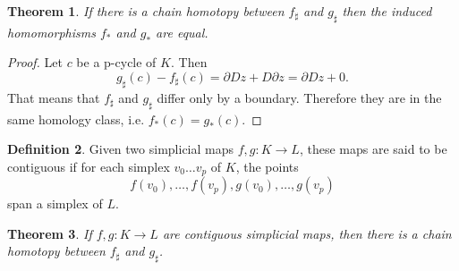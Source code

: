 \documentclass[toc=bib]{scrartcl}
\theoremstyle{plain}
\newtheorem{theorem}{Theorem}[section]
\theoremstyle{definition}
\newtheorem	{definition}[theorem]{Definition}
\theoremstyle{remark}
\begin{document}
\begin{theorem}\label{chain_hom->invariant}%
	If there is a chain homotopy between $f_\sharp$ and $g_\sharp$ then the induced homomorphisms $f_\ast$ and $g_\ast$ are equal.
\end{theorem}

\begin{proof}
	Let $c$ be a p-cycle of $K$. Then
	\[
	g_\sharp(c)-f_\sharp(c)=\partial Dz+D\partial z=\partial Dz+0.
	\]
	That means that $f_\sharp$ and $g_\sharp$ differ only by a boundary. Therefore they are in the same homology class, i.e. $f_\ast(c)=g_\ast(c)$.
\end{proof}
\begin{definition}%
	Given two simplicial maps $f,g: K\to L$, these maps are said to be contiguous if for each simplex $v_0\dots v_p$ of $K$, the points \[
	f(v_0),\dots,f(v_p),g(v_0),\dots,g(v_p)
	\] span a simplex of $L$.
\end{definition}

\begin{theorem}\label{contiguous->chain_hom}%
	If $f,g: K\to L$ are contiguous simplicial maps, then there is a chain homotopy between $f_\sharp$ and $g_\sharp$.
\end{theorem}%
\end{document}
